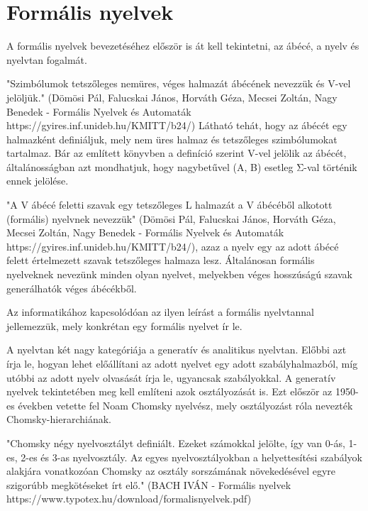 
\section{Formális nyelvek}


A formális nyelvek bevezetéséhez először is át kell tekintetni, az ábécé, a nyelv és nyelvtan fogalmát.

"Szimbólumok tetszőleges nemüres, véges halmazát ábécének nevezzük és V-vel jelöljük." (Dömösi Pál, Falucskai János, Horváth Géza, Mecsei Zoltán, Nagy Benedek - Formális Nyelvek és Automaták https://gyires.inf.unideb.hu/KMITT/b24/) Látható tehát, hogy az ábécét egy halmazként definiáljuk, mely nem üres halmaz és tetszőleges szimbólumokat tartalmaz. Bár az említett könyvben a definíció szerint V-vel jelölik az ábécét, általánosságban azt mondhatjuk, hogy nagybetűvel (A, B) esetleg Σ-val történik ennek jelölése.

"A V ábécé feletti szavak egy tetszőleges L halmazát a V ábécéből alkotott (formális) nyelvnek nevezzük" (Dömösi Pál, Falucskai János, Horváth Géza, Mecsei Zoltán, Nagy Benedek - Formális Nyelvek és Automaták https://gyires.inf.unideb.hu/KMITT/b24/), azaz a nyelv egy az adott ábécé felett értelmezett szavak tetszőleges halmaza lesz. Általánosan formális nyelveknek nevezünk minden olyan nyelvet, melyekben véges hosszúságú szavak generálhatók véges ábécékből.

Az informatikához kapcsolódóan az ilyen leírást a formális nyelvtannal jellemezzük, mely konkrétan egy formális nyelvet ír le.

A nyelvtan két nagy kategóriája a generatív és analitikus nyelvtan. Előbbi azt írja le, hogyan lehet előállítani az adott nyelvet egy adott szabályhalmazból, míg utóbbi az adott nyelv olvasását írja le, ugyancsak szabályokkal.
A generatív nyelvek tekintetében meg kell említeni azok osztályozását is. Ezt először az 1950-es években vetette fel Noam Chomsky nyelvész, mely osztályozást róla nevezték Chomsky-hierarchiának.

"Chomsky négy nyelvosztályt definiált. Ezeket számokkal jelölte, így van 0-ás, 1-es, 2-es és 3-as nyelvosztály. Az egyes nyelvosztályokban a helyettesítési szabályok alakjára vonatkozóan Chomsky az osztály sorszámának növekedésével egyre szigorúbb megkötéseket írt elő." (BACH IVÁN - Formális nyelvek https://www.typotex.hu/download/formalisnyelvek.pdf)


